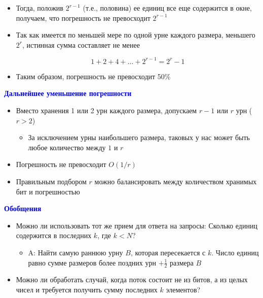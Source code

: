 \documentclass[landscape]{slides}
\begin{document}
\begin{normalsize}
\begin{slide}
\begin{itemize}
\item Тогда, положив $2^{r-1}$  (т.е., половина) ее единиц
все еще содержится в окне, получаем, что погрешность не превосходит $2^{r-1}$

\item Так как имеется по меньшей мере по одной урне каждого размера, меньшего $2^r$, истинная сумма составляет не менее 

$$ 1 + 2 + 4 + \ldots + 2^{r-1}  = 2^r-1 $$

\item Таким образом, погрешность не превосходит 50\%
\end{itemize}
\end{slide}


\begin{slide}
\textbf{\textcolor{blue}{Дальнейшее уменьшение погрешности}}

\begin{itemize}
\item Вместо хранения 1 или 2 урн каждого размера, допускаем $r-1$ или $r$ урн  ($r > 2$)

  \begin{itemize}
  \item За исключением урны наибольшего размера, таковых у нас может быть любое количество между $1$ и $r$ 
  \end{itemize}

\item Погрешность не превосходит $O(1/r)$

\item Правильным подбором $r$ можно балансировать между количеством хранимых бит и погрешностью
\end{itemize}
\end{slide}


\begin{slide}
\textbf{\textcolor{blue}{Обобщения}}


\begin{itemize}
\item Можно ли использовать тот же прием для ответа на запросы: Сколько единиц содержится в последних $k$, где $k<N$?

  \begin{itemize}
  \item A: Найти самую раннюю урну $B$, которая пересекается с $k$. Число единиц равно сумме размеров более поздних
  урн $+\frac 12$ размера $B$
  \end{itemize}

\item Можно ли обработать случай, когда поток состоит не из битов, а из целых чисел и требуется получить сумму последних $k$ элементов?
\end{itemize}
\end{slide}



\end{normalsize}
\end{document}
